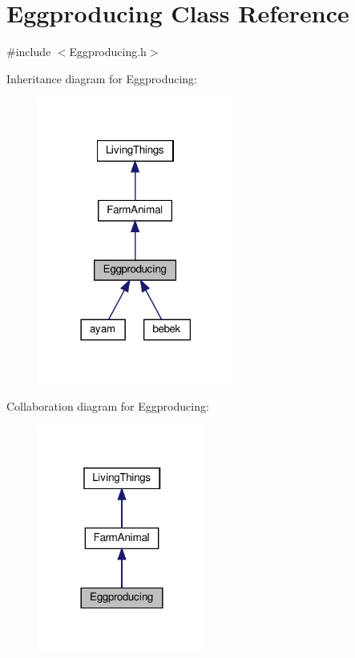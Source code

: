 \hypertarget{classEggproducing}{}\section{Eggproducing Class Reference}
\label{classEggproducing}


{\ttfamily \#include $<$Eggproducing.\+h$>$}



Inheritance diagram for Eggproducing\+:
\nopagebreak
\begin{figure}[H]
\begin{center}
\leavevmode
\includegraphics[width=182pt]{classEggproducing__inherit__graph}
\end{center}
\end{figure}


Collaboration diagram for Eggproducing\+:
\nopagebreak
\begin{figure}[H]
\begin{center}
\leavevmode
\includegraphics[width=156pt]{classEggproducing__coll__graph}
\end{center}
\end{figure}
